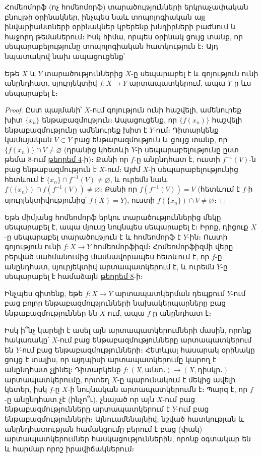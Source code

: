 \documentclass[./main.tex]{subfiles}
\begin{document}
\par Հոմեոմորֆ (ոչ հոմեոմորֆ) տարածությունների երկրաչափական բնույթի օրի\-նակներ, ինչպես նաև տո\-պո\-լո\-գիական այլ ինվարիանտների օրինակներ կբերենք խնդիրների բաժնում և հաջորդ թեմաներում։ Իսկ հիմա, որպես օրինակ ցույց տանք, որ սեպարաբելությունը տոպոլոգիական հատկու\-թյուն է։ Այդ նպատակով նախ ա\-պա\-ցուցենք՝
\begin{theorem}\label{ch9thm8}
\label{11:թեորեմ 4}
    Եթե $X$ և $Y$ տարածություններից $X$-ը սեպարաբել է և գոյություն ունի անընդհատ, սյուրյեկտիվ $f:X\to Y$ արտապատկերում, ապա $Y$-ը ևս սե\-պա\-րաբել է։
\end{theorem}
\begin{proof}
Ըստ պայմանի՝ $X$-ում գոյություն ունի հաշվելի, ամենուրեք խիտ $\{x_n\}$ ենթաբազմություն։ Ապացուցենք, որ $\{f(x_n)\}$ հաշվելի ենթաբազմությունը ա\-մենուրեք խիտ է $Y$-ում։ Դիտարկենք կամայական $V\subset Y$ բաց ենթաբազմություն և ցույց տանք, որ $\{f(x_n)\} \cap V \neq \varnothing$ (դրանից կհետևի $Y$-ի սեպարաբելությունը ըստ թեմա 8-ում \hyperref[ch8thm4]{թեորեմ 4}-ի)։ Քանի որ $f$-ը անընդհատ է, ուստի $f^{-1}(V)$-ն բաց են\-թաբազմություն է $X$-ում։ Այժմ $X$-ի սեպարաբելությունից հետևում է $\{x_n\}\cap f^{-1}(V)\neq \varnothing$, և ուրեմն նաև $f(\{x_n\})\cap f(f^{-1}(V))\neq \varnothing$։ Քանի որ $f(f^{-1}(V))=V$ (հետևում է $f$-ի սյուրյեկտիվությունից՝ $f(X)=Y$), ուստի $f(\{x_n\})\cap V\neq \varnothing$։
\end{proof}
\begin{hetevanq8_sa}\label{ch11cor1}
Եթե միմյանց հոմեոմորֆ երկու տարածություններից մեկը սեպարաբել է, ապա մյուսը նույնպես սեպարաբել է։ Իրոք, դիցուք $X$-ը սե\-պա\-րա\-բել տարածություն է և հոմեոմորֆ է $Y$-ին։ Ուստի գոյություն ունի $f:{X\to Y}$ հոմեոմորֆիզմ։ Հոմեոմորֆիզմի վերը բերված սահմանումից մասնավորապես հե\-տևում է, որ $f$-ը անընդհատ, սյուրյեկտիվ արտապատկերում է, և ուրեմն $Y$-ը սեպա\-րաբել է համաձայն \hyperref[11:թեորեմ 4]{թեորեմ 8}-ի։
\end{hetevanq8_sa}

\par Ինչպես գիտենք, եթե $f:X\rightarrow Y$ արտապատկերման դեպքում $Y$-ում բաց բոլոր ենթաբազմությունների նախակերպարները բաց ենթաբազմություններ են $X$-ում, ապա $f$-ը անընդհատ է։
\par Իսկ ի՞նչ կարելի է ասել այն արտապատկերումների մասին, որոնք հակառակը՝ $X$-ում բաց ենթաբազմությունները արտապատկերում են $Y$-ում բաց են\-թա\-բազ\-մութ\-յունների։ Հետևյալ հասարակ օրինակը ցույց է տալիս, որ այդպիսի ար\-տա\-պատ\-կե\-րումը կարող է  անընդհատ չլինել։ Դիտարկենք $f:(X, \textrm{անտ․}) \rightarrow (X, \textrm{դիսկր․})$ արտապատկերումը, որտեղ $X$-ը պարունակում է մեկից ավելի կետեր, իսկ $f$-ը $X$-ի նույնական արտապատկերումն է։ Պարզ է, որ $f$-ը անընդհատ չէ (ինչո՞ւ), չնայած որ այն $X$-ում բաց ենթաբազմությունները արտապատկերում է $Y$-ում բաց ենթա\-բազ\-մու\-թյունների։ Այնուամենայնիվ, նշված հատկության և անընդհատության համակ\-ցումը բերում է բաց (փակ) արտապատկերումներ հասկացություններին, որոնք օգ\-տակար են և հարմար որոշ իրավիճակներում։
\end{document}
